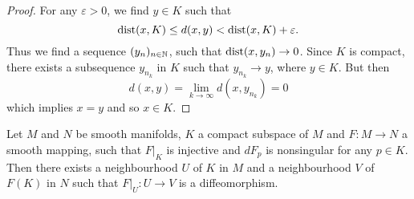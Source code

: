 \begin{proof}
	For any $\varepsilon > 0$, we find $y \in K$ such that 
	\begin{equation*}
		\operatorname{dist}(x,K) \leq d(x,y) < \operatorname{dist}(x,K) + \varepsilon.
	\end{equation*}
	Thus we find a sequence $(y_n)_{n \in \mathbb{N}}$, such that $\operatorname{dist}(x,y_n) \to 0$. Since $K$ is compact, there exists a subsequence $y_{n_k}$ in $K$ such that $y_{n_k} \to y$, where $y \in K$. But then 
	\begin{equation*}
		d(x,y) = \lim_{k \to \infty}d(x,y_{n_k}) = 0
	\end{equation*}
	\noindent which implies $x = y$ and so $x \in K$.
\end{proof}

\begin{theorem}
	Let $M$ and $N$ be smooth manifolds, $K$ a compact subspace of $M$ and $F : M \to N$ a smooth mapping, such that $F \vert_K$ is injective and $dF_p$ is nonsingular for any $p \in K$. Then there exists a neighbourhood $U$ of $K$ in $M$ and a neighbourhood $V$ of $F(K)$ in $N$ such that $F\vert_U : U \to V$ is a diffeomorphism.
	\label{thm:generalization_ift_compact}
\end{theorem}

